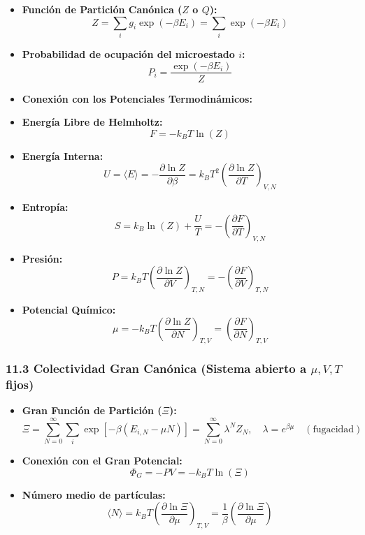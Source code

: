 \documentclass[11pt,a4paper]{article}
\begin{document}
\begin{itemize}
  \item \textbf{Función de Partición Canónica ($Z$ o $Q$):}
  \[
    Z = \sum_i g_i \exp(-\beta E_i) = \sum_i \exp(-\beta E_i)
  \]
  \item \textbf{Probabilidad de ocupación del microestado $i$:}
  \[
    P_i = \frac{\exp(-\beta E_i)}{Z}
  \]
  \item \textbf{Conexión con los Potenciales Termodinámicos:}
  \item \textbf{Energía Libre de Helmholtz:}
  \[
    F = -k_B T \ln(Z)
  \]
  \item \textbf{Energía Interna:}
  \[
    U = \langle E \rangle = -\frac{\partial \ln Z}{\partial \beta} = k_B T^2 \left( \frac{\partial \ln Z}{\partial T} \right)_{V, N}
  \]
  \item \textbf{Entropía:}
  \[
    S = k_B \ln(Z) + \frac{U}{T} = -\left( \frac{\partial F}{\partial T} \right)_{V, N}
  \]
  \item \textbf{Presión:}
  \[
    P = k_B T \left( \frac{\partial \ln Z}{\partial V} \right)_{T, N} = -\left( \frac{\partial F}{\partial V} \right)_{T, N}
  \]
  \item \textbf{Potencial Químico:}
  \[
    \mu = -k_B T \left( \frac{\partial \ln Z}{\partial N} \right)_{T, V} = \left( \frac{\partial F}{\partial N} \right)_{T, V}
  \]
\end{itemize}

\subsubsection*{11.3 Colectividad Gran Canónica (Sistema abierto a $\mu, V, T$ fijos)}

\begin{itemize}
  \item \textbf{Gran Función de Partición ($\Xi$):}
  \[
    \Xi = \sum_{N=0}^\infty \sum_i \exp\left[ -\beta (E_{i,N} - \mu N) \right] = \sum_{N=0}^\infty \lambda^N Z_N, \quad \lambda = e^{\beta \mu} \quad (\text{fugacidad})
  \]
  \item \textbf{Conexión con el Gran Potencial:}
  \[
    \Phi_G = -P V = -k_B T \ln(\Xi)
  \]
  \item \textbf{Número medio de partículas:}
  \[
    \langle N \rangle = k_B T \left( \frac{\partial \ln \Xi}{\partial \mu} \right)_{T, V} = \frac{1}{\beta} \left( \frac{\partial \ln \Xi}{\partial \mu} \right)
  \]
\end{itemize}
\end{document}
